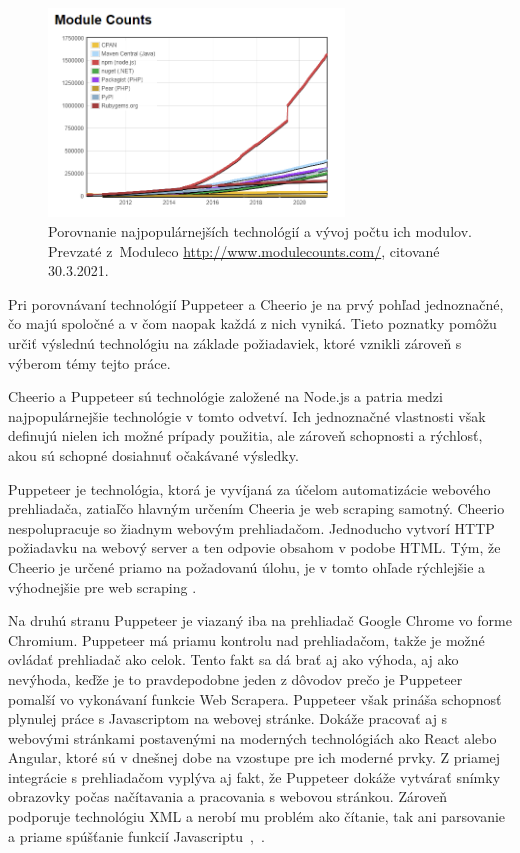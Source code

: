 \begin{figure}[hbt]
	\centering
	\includegraphics[width=0.7\textwidth]{obrazky-figures/modules.png}
	\caption{Porovnanie najpopulárnejších technológií a vývoj počtu ich modulov. Prevzaté z~Moduleco \url{http://www.modulecounts.com/}, citované 30.3.2021.}
	\label{Moduleco_img}
\end{figure}

\bigskip

Pri porovnávaní technológií Puppeteer a Cheerio je na prvý pohľad jednoznačné, čo majú spoločné a v čom naopak každá z nich vyniká. Tieto poznatky pomôžu určiť výslednú technológiu na základe požiadaviek, ktoré vznikli zároveň s výberom témy tejto práce.

Cheerio a Puppeteer sú technológie založené na Node.js a patria medzi najpopulárnejšie technológie v tomto odvetví. Ich jednoznačné vlastnosti však definujú nielen ich možné prípady použitia, ale zároveň schopnosti a rýchlosť, akou sú schopné dosiahnuť očakávané výsledky. 

\newpage

Puppeteer je technológia, ktorá je vyvíjaná za účelom automatizácie webového prehliadača, zatiaľčo hlavným určením Cheeria je web scraping samotný. Cheerio nespolupracuje so žiadnym webovým prehliadačom. Jednoducho vytvorí HTTP požiadavku na webový server a ten odpovie obsahom v podobe HTML. Tým, že Cheerio je určené priamo na požadovanú úlohu, je v tomto ohľade rýchlejšie a výhodnejšie pre web scraping \cite{cheerio}.

Na druhú stranu Puppeteer je viazaný iba na prehliadač Google Chrome vo forme Chromium. Puppeteer má priamu kontrolu nad prehliadačom, takže je možné ovládať prehliadač ako celok. Tento fakt sa dá brať aj ako výhoda, aj ako nevýhoda, keďže je to pravdepodobne jeden z dôvodov prečo je Puppeteer pomalší vo vykonávaní funkcie Web Scrapera. Puppeteer však prináša schopnosť plynulej práce s Javascriptom na webovej stránke. Dokáže pracovať aj s webovými stránkami postavenými na moderných technológiách ako React alebo Angular, ktoré sú v dnešnej dobe na vzostupe pre ich moderné prvky. Z priamej integrácie s prehliadačom vyplýva aj fakt, že Puppeteer dokáže vytvárať snímky obrazovky počas načítavania a pracovania s webovou stránkou. Zároveň podporuje technológiu XML a nerobí mu problém ako čítanie, tak ani parsovanie a priame spúšťanie funkcií Javascriptu~\cite{puppeteer},~\cite{cheerio}. 

